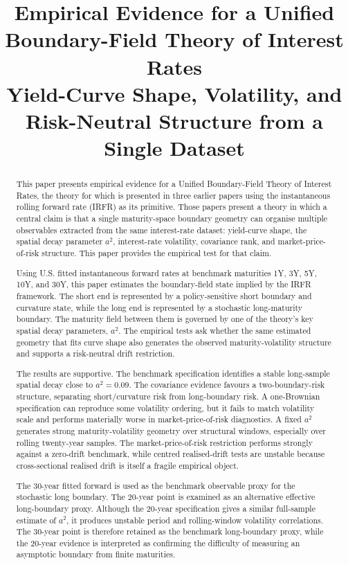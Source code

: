 \documentclass[11pt]{article}
\title{Empirical Evidence for a Unified Boundary-Field Theory of Interest Rates\\[0.4em]
\large Yield-Curve Shape, Volatility, and Risk-Neutral Structure from a Single Dataset}
\author{}
\date{}
\begin{document}
\maketitle

\begin{abstract}
This paper presents empirical evidence for a Unified Boundary-Field Theory of Interest Rates, the theory for which is presented in three earlier papers using the instantaneous rolling forward rate (IRFR) as its primitive. Those papers present a theory in which a central claim is that a single maturity-space boundary geometry can organise multiple observables extracted from the same interest-rate dataset: yield-curve shape, the spatial decay parameter $a^2$, interest-rate volatility, covariance rank, and market-price-of-risk structure. This paper provides the empirical test for that claim.

Using U.S. fitted instantaneous forward rates at benchmark maturities 1Y, 3Y, 5Y, 10Y, and 30Y, this paper estimates the boundary-field state implied by the IRFR framework. The short end is represented by a policy-sensitive short boundary and curvature state, while the long end is represented by a stochastic long-maturity boundary. The maturity field between them is governed by one of the theory's key spatial decay parameters, $a^2$. The empirical tests ask whether the same estimated geometry that fits curve shape also generates the observed maturity-volatility structure and supports a risk-neutral drift restriction.

The results are supportive. The benchmark specification identifies a stable long-sample spatial decay close to $a^2=0.09$. The covariance evidence favours a two-boundary-risk structure, separating short/curvature risk from long-boundary risk. A one-Brownian specification can reproduce some volatility ordering, but it fails to match volatility scale and performs materially worse in market-price-of-risk diagnostics. A fixed $a^2$ generates strong maturity-volatility geometry over structural windows, especially over rolling twenty-year samples. The market-price-of-risk restriction performs strongly against a zero-drift benchmark, while centred realised-drift tests are unstable because cross-sectional realised drift is itself a fragile empirical object.

The 30-year fitted forward is used as the benchmark observable proxy for the stochastic long boundary. The 20-year point is examined as an alternative effective long-boundary proxy. Although the 20-year specification gives a similar full-sample estimate of $a^2$, it produces unstable period and rolling-window volatility correlations. The 30-year point is therefore retained as the benchmark long-boundary proxy, while the 20-year evidence is interpreted as confirming the difficulty of measuring an asymptotic boundary from finite maturities.


\end{abstract}
\end{document}
